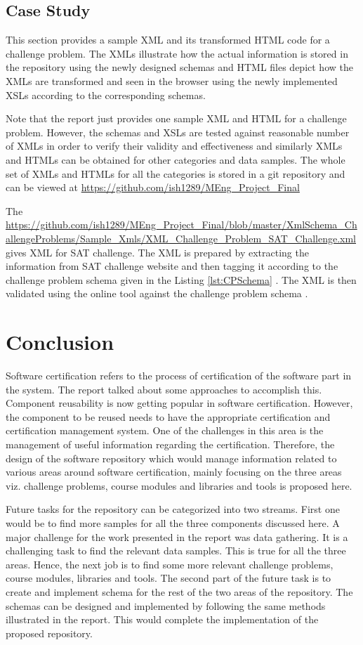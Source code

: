 \documentclass[11pt,letterpaper]{report}
\begin{document}
\section{Case Study}
This section provides a sample XML and its transformed HTML code for a challenge problem. The XMLs illustrate how the actual information is stored in the repository using the newly designed schemas and HTML files depict how the XMLs are transformed and seen in the browser using the newly implemented XSLs according to the corresponding schemas. 

Note that the report just provides one sample XML and HTML for a challenge problem. However, the schemas and XSLs are tested against reasonable number of XMLs in order to verify their validity and effectiveness and similarly XMLs and HTMLs can be obtained for other categories and data samples. The whole set of XMLs and HTMLs for all the categories is stored in a git repository and can be viewed at \url{https://github.com/ish1289/MEng_Project_Final}

The \url{https://github.com/ish1289/MEng_Project_Final/blob/master/XmlSchema_ChallengeProblems/Sample_Xmls/XML_Challenge_Problem_SAT_Challenge.xml} gives XML for SAT challenge. The XML is prepared by extracting the information from SAT challenge website and then tagging it according to the challenge problem schema given in the Listing \ref{lst:CPSchema} \cite{SAT}. The XML is then validated using the online tool against the challenge problem schema \cite{olXSD}.

\chapter{Conclusion}
Software certification refers to the process of certification of the software part in the system. The report talked about some approaches to accomplish this. Component reusability is now getting popular in software certification. However, the component to be reused needs to have the appropriate certification and certification management system. One of the challenges in this area is the management of useful information regarding the certification. Therefore, the design of the software repository which would manage information related to various areas around software certification, mainly focusing on the three areas viz. challenge problems, course modules and libraries and tools is proposed here.  

Future tasks for the repository can be categorized into two streams. First one would be to find more samples for all the three components discussed here. A major challenge for the work presented in the report was data gathering. It is a challenging task to find the relevant data samples. This is true for all the three areas. Hence, the next job is to find some more relevant challenge problems, course modules, libraries and tools. The second part of the future task is to create and implement schema for the rest of the two areas of the repository. The schemas can be designed and implemented by following the same methods illustrated in the report. This would complete the implementation of the proposed repository.  
\end{document}
